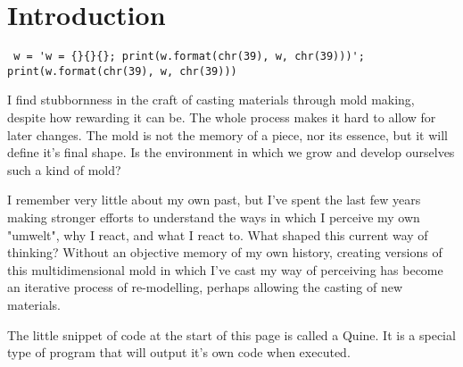 
\chapter*{Introduction}

\footnotesize \begin{verbatim}
 w = 'w = {}{}{}; print(w.format(chr(39), w, chr(39)))'; print(w.format(chr(39), w, chr(39)))
\end{verbatim} \normalsize
    


I find stubbornness in the craft of casting materials through mold making, despite how rewarding it can be. The whole process makes it hard to allow for later changes. The mold is not the memory of a piece, nor its essence, but it will define it's final shape. Is the environment in which we grow and develop ourselves such a kind of mold? 

I remember very little about my own past, but I’ve spent the last few years making stronger efforts to understand the ways in which I perceive my own "umwelt", why I react, and what I react to. What shaped this current way of thinking? Without an objective memory of my own history, creating versions of this multidimensional mold in which I’ve cast my way of perceiving has become an iterative process of re-modelling, perhaps allowing the casting of new materials.

The little snippet of code at the start of this page is called a Quine. It is a special type of program that will output it's own code when executed. 
